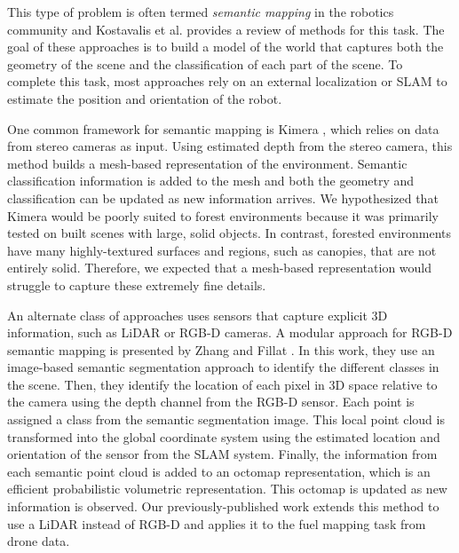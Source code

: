 This type of problem is often termed \textit{semantic mapping} in the robotics community and Kostavalis et al. \cite{Kostavelis2015SemanticSurvey} provides a review of methods for this task. The goal of these approaches is to build a model of the world that captures both the geometry of the scene and the classification of each part of the scene. To complete this task, most approaches rely on an external localization or SLAM to estimate the position and orientation of the robot.

One common framework for semantic mapping is Kimera \cite{Rosinol2020}, which relies on data from stereo cameras as input. Using estimated depth from the stereo camera, this method builds a mesh-based representation of the environment. Semantic classification information is added to the mesh and both the geometry and classification can be updated as new information arrives. We hypothesized that Kimera would be poorly suited to forest environments because it was primarily tested on built scenes with large, solid objects. In contrast, forested environments have many highly-textured surfaces and regions, such as canopies, that are not entirely solid. Therefore, we expected that a mesh-based representation would struggle to capture these extremely fine details.

An alternate class of approaches uses sensors that capture explicit 3D information, such as LiDAR or RGB-D cameras. A modular approach for RGB-D semantic mapping is presented by Zhang and Fillat \cite{semantic_slam_RGBD}. In this work, they use an image-based semantic segmentation approach to identify the different classes in the scene. Then, they identify the location of each pixel in 3D space relative to the camera using the depth channel from the RGB-D sensor. Each point is assigned a class from the semantic segmentation image. This local point cloud is transformed into the global coordinate system using the estimated location and orientation of the sensor from the SLAM system. Finally, the information from each semantic point cloud is added to an octomap \cite{hornung13auro} representation, which is an efficient probabilistic volumetric representation.  This octomap is updated as new information is observed. Our previously-published work \cite{RussellUnmannedMitigation} extends this method to use a LiDAR instead of RGB-D and applies it to the fuel mapping task from drone data.


